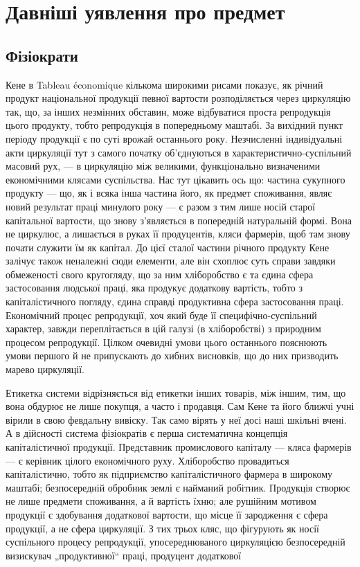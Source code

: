 

\section[Давніші уявлення про предмет]{Давніші уявлення про предмет\footnotemark{}}

\subsection{Фізіократи}

\label{original-274}
Кене в Tableau économique кількома широкими рисами показує, як
річний продукт національної продукції певної вартости розподіляється через
циркуляцію так, що, за інших незмінних обставин, може відбуватися проста
репродукція цього продукту, тобто репродукція в попередньому маштабі.
За вихідний пункт періоду продукції є по суті врожай останнього року.
Незчисленні індивідуальні акти циркуляції тут з самого початку об’єднуються
в характеристично-суспільний масовий рух, — в циркуляцію між
великими, функціонально визначеними економічними клясами суспільства.
Нас тут цікавить ось що: частина сукупного продукту — що, як і всяка
інша частина його, як предмет споживання, являє новий результат праці
минулого року — є разом з тим лише носій старої капітальної вартости,
що знову з’являється в попередній натуральній формі. Вона не циркулює,
а лишається в руках її продуцентів, кляси фармерів, щоб там знову почати
служити їм як капітал. До цієї сталої частини річного продукту
Кене залічує також неналежні сюди елементи, але він схоплює суть
справи завдяки обмеженості свого кругогляду, що за ним хліборобство є
та єдина сфера застосовання людської праці, яка продукує додаткову
вартість, тобто з капіталістичного погляду, єдина справді продуктивна
сфера застосовання праці. Економічний процес репродукції, хоч який
буде її специфічно-суспільний характер, завжди переплітається в цій
галузі (в хліборобстві) з природним процесом репродукції. Цілком очевидні
умови цього останнього пояснюють умови першого й не припускають
до хибних висновків, що до них призводить марево циркуляції.

Етикетка системи відрізняється від етикетки інших товарів, між
іншим, тим, що вона обдурює не лише покупця, а часто і продавця.
Сам Кене та його ближчі учні вірили в свою февдальну вивіску. Так
само вірять у неї досі наші шкільні вчені. А в дійсності система фізіократів
є перша систематична концепція капіталістичної продукції. Представник
промислового капіталу — кляса фармерів — є керівник цілого
економічного руху. Хліборобство провадиться капіталістично, тобто як
підприємство капіталістичного фармера в широкому маштабі; безпосередній
обробник землі є найманий робітник. Продукція створює не лише
предмети споживання, а й вартість їхню; але рушійним мотивом продукції
є здобування додаткової вартости, що місце її зародження є
сфера продукції, а не сфера циркуляції. З тих трьох кляс, що фігурують
як носії суспільного процесу репродукції, упосереднюваного циркуляцією
безпосередній визискувач „продуктивної“ праці, продуцент додаткової
\parbreak{}  %

